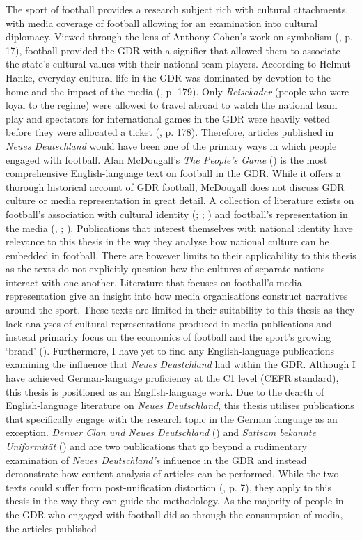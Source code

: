 The sport of football provides a research subject rich with cultural attachments, with media coverage of football allowing for an examination into cultural diplomacy. Viewed through the lens of Anthony Cohen’s work on symbolism (\citeyear{cohen1995}, p. 17), football provided the GDR with a signifier that allowed them to associate the state’s cultural values with their national team players. According to Helmut Hanke, everyday cultural life in the GDR was dominated by devotion to the home and the impact of the media (\citeyear{hanke1990}, p. 179). Only \textit{Reisekader} (people who were loyal to the regime) were allowed to travel abroad to watch the national team play and spectators for international games in the GDR were heavily vetted before they were allocated a ticket (\cite{mcdougall2014}, p. 178). Therefore, articles published in \textit{Neues Deutschland} would have been one of the primary ways in which people engaged with football. Alan McDougall’s \textit{The People’s Game} (\citeyear{mcdougall2014}) is the most comprehensive English-language text on football in the GDR. While it offers a thorough historical account of GDR football, McDougall does not discuss GDR culture or media representation in great detail. A collection of literature exists on football’s association with cultural identity (\cite{archetti1994}; \cite{gibbons2014}; \cite{bocketti2016}) and football’s representation in the media (\cite{boylehaynes2004}, \cite{bridgewater2010}; \cite{miller2011}). Publications that interest themselves with national identity have relevance to this thesis in the way they analyse how national culture can be embedded in football. There are however limits to their applicability to this thesis as the texts do not explicitly question how the cultures of separate nations interact with one another. Literature that focuses on football’s media representation give an insight into how media organisations construct narratives around the sport. These texts are limited in their suitability to this thesis as they lack analyses of cultural representations produced in media publications and instead primarily focus on the economics of football and the sport’s growing ‘brand’ (\cite{bridgewater2010}). Furthermore, I have yet to find any English-language publications examining the influence that \textit{Neues Deustchland} had within the GDR. Although I have achieved German-language proficiency at the C1 level (CEFR standard), this thesis is positioned as an English-language work. Due to the dearth of English-language literature on \textit{Neues Deutschland}, this thesis utilises publications that specifically engage with the research topic in the German language as an exception. \textit{Denver Clan und Neues Deutschland} (\cite{meyen2003}) and \textit{Sattsam bekannte Uniformität} (\cite{meyenschweiger2008}) and are two publications that go beyond a rudimentary examination of \textit{Neues Deutschland’s} influence in the GDR and instead demonstrate how content analysis of articles can be performed. While the two texts could suffer from post-unification distortion (\cite{fullbrook1995}, p. 7), they apply to this thesis in the way they can guide the methodology. As the majority of people in the GDR who engaged with football did so through the consumption of media, the articles published 